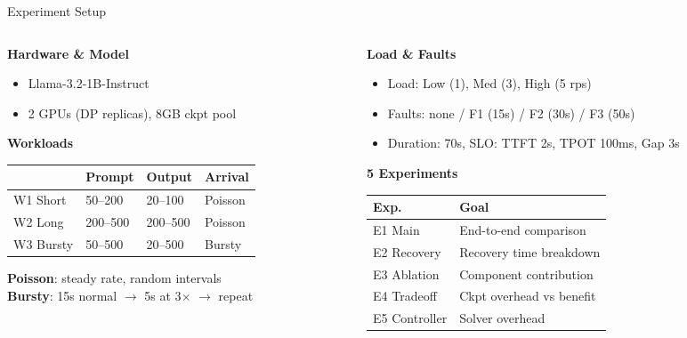 \documentclass[aspectratio=169,12pt]{beamer}
\begin{document}
\begin{frame}{Experiment Setup}
\begin{columns}[T]
\begin{column}{0.48\textwidth}
\textbf{Hardware \& Model}
\begin{itemize}
    \item Llama-3.2-1B-Instruct
    \item 2 GPUs (DP replicas), 8GB ckpt pool
\end{itemize}

\vspace{0.3em}
\textbf{Workloads}

{\small
\begin{tabular}{llll}
\toprule
 & Prompt & Output & Arrival \\
\midrule
W1 Short & 50--200 & 20--100 & Poisson \\
W2 Long & 200--500 & 200--500 & Poisson \\
W3 Bursty & 50--500 & 20--500 & Bursty \\
\bottomrule
\end{tabular}
}

\vspace{0.3em}
{\scriptsize
\textbf{Poisson}: steady rate, random intervals\\
\textbf{Bursty}: 15s normal $\rightarrow$ 5s at 3$\times$ $\rightarrow$ repeat
}
\end{column}
\begin{column}{0.48\textwidth}
\textbf{Load \& Faults}
\begin{itemize}
    \item Load: Low (1), Med (3), High (5 rps)
    \item Faults: none / F1 (15s) / F2 (30s) / F3 (50s)
    \item Duration: 70s, SLO: TTFT 2s, TPOT 100ms, Gap 3s
\end{itemize}

\vspace{0.3em}
\textbf{5 Experiments}

{\small
\begin{tabular}{ll}
\toprule
\textbf{Exp.} & \textbf{Goal} \\
\midrule
E1 Main & End-to-end comparison \\
E2 Recovery & Recovery time breakdown \\
E3 Ablation & Component contribution \\
E4 Tradeoff & Ckpt overhead vs benefit \\
E5 Controller & Solver overhead \\
\bottomrule
\end{tabular}
}
\end{column}
\end{columns}
\end{frame}
\end{document}
